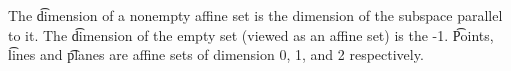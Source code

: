 


The \t{dimension} of a nonempty affine set is the dimension of the subspace parallel to it.
The \t{dimension} of the empty set (viewed as an affine set) is the -1.
\t{Points}, \t{lines} and \t{planes} are affine sets of dimension 0, 1, and 2 respectively.
